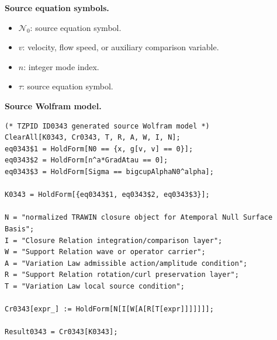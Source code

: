 \begin{minipage}[t]{0.49\linewidth}
\begingroup
\small
\raggedright
\textbf{Source equation symbols.}\par
\begin{itemize}[leftmargin=1.35em,itemsep=1pt,topsep=1pt,parsep=0pt]
    \item $\mathcal{N}_{0}$: source equation symbol.
    \item $v$: velocity, flow speed, or auxiliary comparison variable.
    \item $n$: integer mode index.
    \item $\tau$: source equation symbol.
\end{itemize}
\endgroup
\end{minipage}\hfill
\begin{minipage}[t]{0.47\linewidth}
\begingroup
\scriptsize
\raggedright
\textbf{Source Wolfram model.}\par
\begin{Verbatim}[fontsize=\tiny,breaklines=true,breakanywhere=true]
(* TZPID ID0343 generated source Wolfram model *)
ClearAll[K0343, Cr0343, T, R, A, W, I, N];
eq0343$1 = HoldForm[N0 == {x, g[v, v] == 0}];
eq0343$2 = HoldForm[n^a*GradAtau == 0];
eq0343$3 = HoldForm[Sigma == bigcupAlphaN0^alpha];

K0343 = HoldForm[{eq0343$1, eq0343$2, eq0343$3}];

N = "normalized TRAWIN closure object for Atemporal Null Surface Basis";
I = "Closure Relation integration/comparison layer";
W = "Support Relation wave or operator carrier";
A = "Variation Law admissible action/amplitude condition";
R = "Support Relation rotation/curl preservation layer";
T = "Variation Law local source condition";

Cr0343[expr_] := HoldForm[N[I[W[A[R[T[expr]]]]]]];

Result0343 = Cr0343[K0343];
\end{Verbatim}
\endgroup
\end{minipage}

